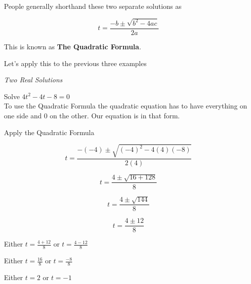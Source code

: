 \documentclass{ximera}
\begin{document}
People generally shorthand these two separate solutions as



\[ t  =   \frac{-b \pm \sqrt{b^2 - 4 a c}}{2a}      \]


This is known as \textbf{The Quadratic Formula}.


Let's apply this to the previous three examples







\begin{example} \textit{Two Real Solutions} 

Solve $4 t^2 - 4 t - 8 = 0$ \\

To use the Quadratic Formula the quadratic equation has to have everything on one side and $0$ on the other.  Our equation is in that form.

Apply the Quadratic Formula


\[   t = \frac{-(-4) \pm \sqrt{(-4)^2 - 4 (4) (-8)}}{2 (4)}            \]

\[   t = \frac{4 \pm \sqrt{16 + 128}}{8}            \]

\[   t = \frac{4 \pm \sqrt{144}}{8}            \]

\[   t = \frac{4 \pm 12}{8}            \]




Either $t = \frac{4 + 12}{8} $ or $t = \frac{4 - 12}{8} $

Either $t = \frac{16}{8} $ or $t = \frac{-8}{8} $

Either $t = 2$ or $t = -1$



\end{example}
\end{document}
